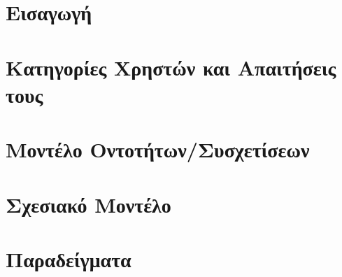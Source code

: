 \documentclass[12pt]{article}
\begin{document}
\maketitle \newpage
{}
\tableofcontents \newpage

\section{Εισαγωγή}


\section{Κατηγορίες Χρηστών και Απαιτήσεις τους}


\section{Μοντέλο Οντοτήτων/Συσχετίσεων}


\section{Σχεσιακό Μοντέλο}


\section{Παραδείγματα}

\end{document}
